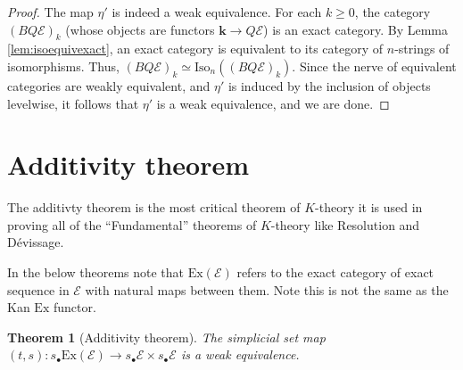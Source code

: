\documentclass[12pt]{report}
\numberwithin{equation}{section}
\newtheorem{theorem}[dummy]{Theorem}
\begin{document}
\begin{proof}
		The map $\eta'$ is indeed a weak equivalence. For each $k \ge 0$, the category $(BQ\mathcal{E})_k$ (whose objects are functors $\mathbf{k} \to Q\mathcal{E}$) is an exact category. By Lemma \ref{lem:isoequivexact}, an exact category is equivalent to its category of $n$-strings of isomorphisms. Thus, $(BQ\mathcal{E})_k \simeq \mathrm{Iso}_n((BQ\mathcal{E})_k)$. Since the nerve of equivalent categories are weakly equivalent, and $\eta'$ is induced by the inclusion of objects levelwise, it follows that $\eta'$ is a weak equivalence, and we are done.
	\end{proof}
	
	\section{Additivity theorem}
	The additivty theorem is the most critical theorem of \( K \)-theory it is used in proving all of the ``Fundamental'' theorems of \( K \)-theory like Resolution and D\'evissage.
	
	In the below theorems note that \( \mathrm{Ex}(\mathcal{E}) \) refers to the exact category of exact sequence in \( \mathcal{E} \) with natural maps between them. Note this is not the same as the Kan \( \mathrm{Ex} \) functor.
	
	\begin{theorem}[Additivity theorem]
		The simplicial set map \( (t,s) : s_\bullet \mathrm{Ex}(\mathcal{E}) \to s_\bullet \mathcal{ E}  \times s_\bullet \mathcal{E}\) is a weak equivalence.
	\end{theorem}
	
\end{document}
